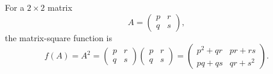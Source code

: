 \begin{example} For a $2\times2$ matrix 
\[
A=\begin{pmatrix}p & r\\
q & s
\end{pmatrix},
\]
the matrix-square function is 
\[
f(A)=A^{2}=\begin{pmatrix}p & r\\
q & s
\end{pmatrix}\begin{pmatrix}p & r\\
q & s
\end{pmatrix}=\begin{pmatrix}p^{2}+qr & pr+rs\\
pq+qs & qr+s^{2}
\end{pmatrix}.
\]
\end{example}

